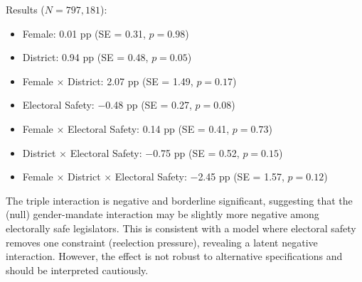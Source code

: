 \documentclass[12pt]{article}
\begin{document}
Results ($N = 797{,}181$):
\begin{itemize}
\item Female: 0.01 pp (SE = 0.31, $p = 0.98$)
\item District: 0.94 pp (SE = 0.48, $p = 0.05$)
\item Female $\times$ District: 2.07 pp (SE = 1.49, $p = 0.17$)
\item Electoral Safety: $-$0.48 pp (SE = 0.27, $p = 0.08$)
\item Female $\times$ Electoral Safety: 0.14 pp (SE = 0.41, $p = 0.73$)
\item District $\times$ Electoral Safety: $-$0.75 pp (SE = 0.52, $p = 0.15$)
\item Female $\times$ District $\times$ Electoral Safety: $-$2.45 pp (SE = 1.57, $p = 0.12$)
\end{itemize}

The triple interaction is negative and borderline significant, suggesting that the (null) gender-mandate interaction may be slightly more negative among electorally safe legislators. This is consistent with a model where electoral safety removes one constraint (reelection pressure), revealing a latent negative interaction. However, the effect is not robust to alternative specifications and should be interpreted cautiously.
\end{document}
